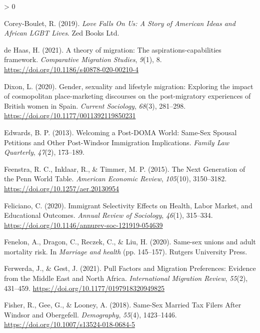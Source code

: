 \documentclass[
  12pt,
]{article}
\newlength{\cslhangindent}
\newenvironment{CSLReferences}[2] %
 {%
  \setlength{\parindent}{0pt}
  \ifodd #1 \everypar{\setlength{\hangindent}{\cslhangindent}}\ignorespaces\fi
  \ifnum #2 > 0
  \setlength{\parskip}{#2\baselineskip}
  \fi
 }%
 {}
\begin{document}
\begin{CSLReferences}{1}{0}
\leavevmode\hypertarget{ref-corey-boulet_2019}{}%
Corey-Boulet, R. (2019). \emph{Love {Falls On Us}: A {Story} of {American Ideas} and {African LGBT Lives}}. {Zed Books Ltd.}

\leavevmode\hypertarget{ref-dehaas_2021}{}%
de Haas, H. (2021). A theory of migration: The aspirations-capabilities framework. \emph{Comparative Migration Studies}, \emph{9}(1), 8. \url{https://doi.org/10.1186/s40878-020-00210-4}

\leavevmode\hypertarget{ref-dixon_2020}{}%
Dixon, L. (2020). Gender, sexuality and lifestyle migration: Exploring the impact of cosmopolitan place-marketing discourses on the post-migratory experiences of {British} women in {Spain}. \emph{Current Sociology}, \emph{68}(3), 281--298. \url{https://doi.org/10.1177/0011392119850231}

\leavevmode\hypertarget{ref-edwards_2013}{}%
Edwards, B. P. (2013). Welcoming a {Post}-{DOMA World}: Same-{Sex Spousal Petitions} and {Other Post}-{Windsor Immigration Implications}. \emph{Family Law Quarterly}, \emph{47}(2), 173--189.

\leavevmode\hypertarget{ref-feenstra_2015}{}%
Feenstra, R. C., Inklaar, R., \& Timmer, M. P. (2015). The {Next Generation} of the {Penn World Table}. \emph{American Economic Review}, \emph{105}(10), 3150--3182. \url{https://doi.org/10.1257/aer.20130954}

\leavevmode\hypertarget{ref-feliciano_2020}{}%
Feliciano, C. (2020). Immigrant {Selectivity Effects} on {Health}, {Labor Market}, and {Educational Outcomes}. \emph{Annual Review of Sociology}, \emph{46}(1), 315--334. \url{https://doi.org/10.1146/annurev-soc-121919-054639}

\leavevmode\hypertarget{ref-fenelon_2020_samesex}{}%
Fenelon, A., Dragon, C., Reczek, C., \& Liu, H. (2020). Same-sex unions and adult mortality risk. In \emph{Marriage and health} (pp. 145--157). {Rutgers University Press}.

\leavevmode\hypertarget{ref-ferwerda_2021_pull}{}%
Ferwerda, J., \& Gest, J. (2021). Pull {Factors} and {Migration Preferences}: Evidence from the {Middle East} and {North Africa}. \emph{International Migration Review}, \emph{55}(2), 431--459. \url{https://doi.org/10.1177/0197918320949825}

\leavevmode\hypertarget{ref-fisher_2018}{}%
Fisher, R., Gee, G., \& Looney, A. (2018). Same-{Sex Married Tax Filers After Windsor} and {Obergefell}. \emph{Demography}, \emph{55}(4), 1423--1446. \url{https://doi.org/10.1007/s13524-018-0684-5}


\end{CSLReferences}
\end{document}
